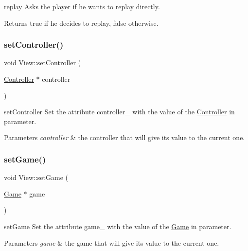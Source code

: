 replay Asks the player if he wants to replay directly. 

\begin{DoxyReturn}{Returns}
true if he decides to replay, false otherwise. 
\end{DoxyReturn}
\mbox{\label{class_view_ac837e4c674546a4bfccbb58250a81f6b}} 
\subsubsection{\texorpdfstring{set\+Controller()}{setController()}}
{\footnotesize\ttfamily void View\+::set\+Controller (\begin{DoxyParamCaption}\item[{\hyperlink{class_controller}{Controller} $\ast$}]{controller }\end{DoxyParamCaption})}



set\+Controller Set the attribute controller\+\_\+ with the value of the \hyperlink{class_controller}{Controller} in parameter. 


\begin{DoxyParams}{Parameters}
{\em controller} & the controller that will give its value to the current one. \\
\hline
\end{DoxyParams}
\mbox{\label{class_view_a3f47f684fa69af930056c56e4d559c7d}} 
\subsubsection{\texorpdfstring{set\+Game()}{setGame()}}
{\footnotesize\ttfamily void View\+::set\+Game (\begin{DoxyParamCaption}\item[{\hyperlink{class_game}{Game} $\ast$}]{game }\end{DoxyParamCaption})}



set\+Game Set the attribute game\+\_\+ with the value of the \hyperlink{class_game}{Game} in parameter. 


\begin{DoxyParams}{Parameters}
{\em game} & the game that will give its value to the current one. \\
\hline
\end{DoxyParams}
\mbox{\label{class_view_a64dc507a5155d043b399d34c0fd4ab97}} 
